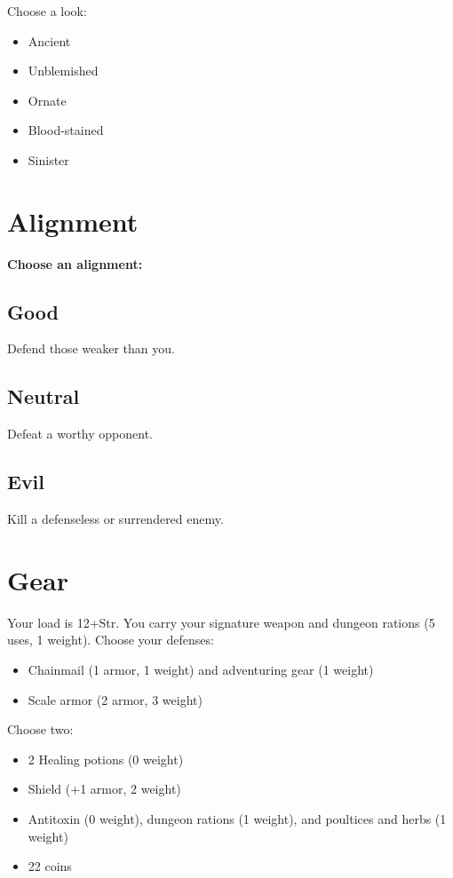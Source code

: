  Choose a look:
\begin{itemize}
\item Ancient
\item Unblemished
\item Ornate
\item Blood-stained
\item Sinister

\end{itemize}
\section*{Alignment}


{\bfseries Choose an alignment:}
\subsection{Good}


 Defend those weaker than you.
\subsection{Neutral}


 Defeat a worthy opponent.
\subsection{Evil}


 Kill a defenseless or surrendered enemy.
\section*{Gear}


 Your load is 12+Str. You carry your signature weapon and dungeon rations (5 uses, 1 weight). Choose your defenses:
\begin{itemize}
\item Chainmail (1 armor, 1 weight) and adventuring gear (1 weight)
\item Scale armor (2 armor, 3 weight)

\end{itemize}


 Choose two:
\begin{itemize}
\item 2 Healing potions (0 weight)
\item Shield (+1 armor, 2 weight)
\item Antitoxin (0 weight), dungeon rations (1 weight), and poultices and herbs (1 weight)
\item 22 coins

\end{itemize}
